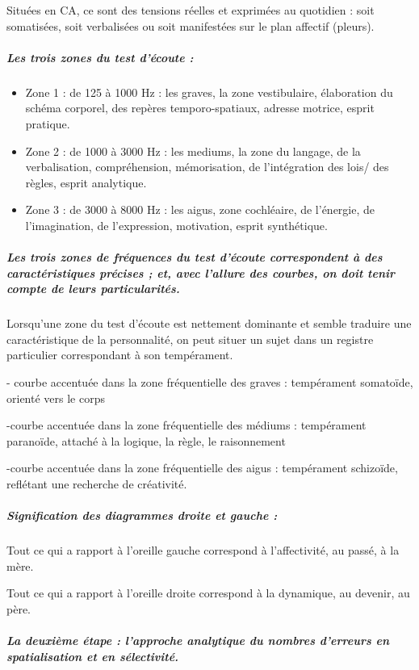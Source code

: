 Situées en CA, ce sont des tensions réelles et exprimées au quotidien
: soit somatisées, soit verbalisées ou soit manifestées sur le plan
affectif (pleurs).

\subparagraph{Les trois zones du test d'écoute : }
\begin{itemize}
\item Zone 1 : de 125 à 1000 Hz : les graves, la zone vestibulaire, élaboration
du schéma corporel, des repères temporo-spatiaux, adresse motrice,
esprit pratique.
\item Zone 2 : de 1000 à 3000 Hz : les mediums, la zone du langage, de la
verbalisation, compréhension, mémorisation, de l'intégration des lois/
des règles, esprit analytique.
\item Zone 3 : de 3000 à 8000 Hz : les aigus, zone cochléaire, de l'énergie,
de l'imagination, de l'expression, motivation, esprit synthétique.
\end{itemize}

\subparagraph{Les trois zones de fréquences du test d'écoute correspondent à des
caractéristiques précises ; et, avec l'allure des courbes, on doit
tenir compte de leurs particularités.}

Lorsqu'une zone du test d'écoute est nettement dominante et semble
traduire une caractéristique de la personnalité, on peut situer un
sujet dans un registre particulier correspondant à son tempérament.

- courbe accentuée dans la zone fréquentielle des graves : tempérament
somatoïde, orienté vers le corps

-courbe accentuée dans la zone fréquentielle des médiums : tempérament
paranoïde, attaché à la logique, la règle, le raisonnement 

-courbe accentuée dans la zone fréquentielle des aigus : tempérament
schizoïde, reflétant une recherche de créativité.

\subparagraph{Signification des diagrammes droite et gauche : }

Tout ce qui a rapport à l'oreille gauche correspond à l\textquoteright affectivité,
au passé, à la mère. 

Tout ce qui a rapport à l'oreille droite correspond à la dynamique,
au devenir, au père. 

\subparagraph{La deuxième étape : l'approche analytique du nombres d'erreurs en
spatialisation et en sélectivité.}

